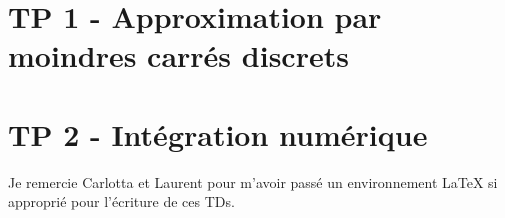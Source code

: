 




\section{TP 1 - Approximation par moindres carr\'es discrets}


\newpage

 \section{TP 2 - Int\'egration num\'erique}


\newpage

Je remercie Carlotta et Laurent pour m'avoir pass\'e un environnement {\LaTeX} si appropri\'e
pour l'\'ecriture de ces TDs.




